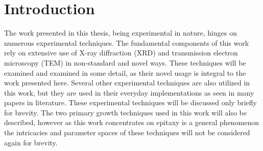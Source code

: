 \section{Introduction}
The work presented in this thesis, being experimental in nature, hinges on numerous experimental techniques.
The fundamental components of this work rely on extensive use of X-ray diffraction (XRD) and transmission electron microscopy (TEM) in non-standard and novel ways.
These techniques will be examined and examined in some detail, as their novel usage is integral to the work presented here.
Several other experimental techniques are also utilized in this work, but they are used in their everyday implementations as seen in many papers in literature.
These experimental techniques will be discussed only briefly for brevity.
The two primary growth techniques used in this work will also be described, however as this work concentrates on epitaxy is a general phenomenon the intricacies and parameter spaces of these techniques will not be considered again for brevity.

